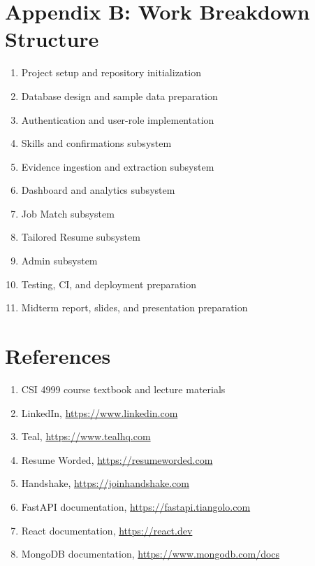 \documentclass[11pt]{article}
\begin{document}
\section{Appendix B: Work Breakdown Structure}
\begin{enumerate}[leftmargin=1.5em]
  \item Project setup and repository initialization
  \item Database design and sample data preparation
  \item Authentication and user-role implementation
  \item Skills and confirmations subsystem
  \item Evidence ingestion and extraction subsystem
  \item Dashboard and analytics subsystem
  \item Job Match subsystem
  \item Tailored Resume subsystem
  \item Admin subsystem
  \item Testing, CI, and deployment preparation
  \item Midterm report, slides, and presentation preparation
\end{enumerate}

\section{References}
\begin{enumerate}[leftmargin=1.5em]
  \item CSI 4999 course textbook and lecture materials
  \item LinkedIn, \url{https://www.linkedin.com}
  \item Teal, \url{https://www.tealhq.com}
  \item Resume Worded, \url{https://resumeworded.com}
  \item Handshake, \url{https://joinhandshake.com}
  \item FastAPI documentation, \url{https://fastapi.tiangolo.com}
  \item React documentation, \url{https://react.dev}
  \item MongoDB documentation, \url{https://www.mongodb.com/docs}
\end{enumerate}
\end{document}
